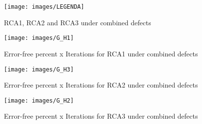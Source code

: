 \begin{figure}[h!]
\center
{}
\linebreak
{}
\linebreak
{}
\linebreak
{\texttt{[image: images/LEGENDA]}
}
\caption{RCA1, RCA2 and RCA3 under combined defects}
\label{figure:RCA_t1}
\end{figure}

\pagebreak
{}

\begin{figure}[h!]
\center
\texttt{[image: images/G\_H1]}
\caption{Error-free percent x Iterations for RCA1 under combined defects}
\label{figure:RCA_reg_gt1}
\end{figure}

\begin{figure}[h!]
\center
\texttt{[image: images/G\_H3]}
\caption{Error-free percent x Iterations for RCA2 under combined defects}
\label{figure:RCA_mod2_gt1}
\end{figure}

\begin{figure}[h!]
\center
\texttt{[image: images/G\_H2]}
\caption{Error-free percent x Iterations for RCA3 under combined defects}
\label{figure:RCA_mod1_gt1}
\end{figure}


